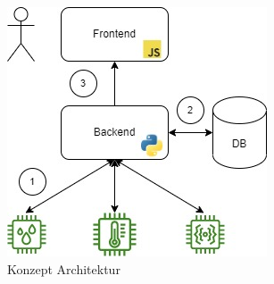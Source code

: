 \documentclass[letterpaper, 10 pt, conference]{ieeeconf}  %
\begin{document}
\begin{figure}[thpb]
      \centering
      \includegraphics[scale=0.6]{abbildungen/arch.jpeg}
      \caption{Konzept Architektur}
      \label{fig:arch}
 \end{figure}


\addtolength{\textheight}{-10cm}   %
\end{document}
